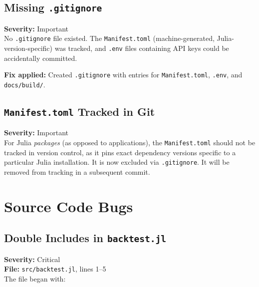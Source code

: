 \documentclass[11pt,a4paper]{article}
\begin{document}
\subsection{Missing \texttt{.gitignore}}
\label{sec:gitignore}

\textbf{Severity:} Important\\[0.3em]
No \texttt{.gitignore} file existed. The \texttt{Manifest.toml} (machine-generated,
Julia-version-specific) was tracked, and \texttt{.env} files containing API keys
could be accidentally committed.

\textbf{Fix applied:} Created \texttt{.gitignore} with entries for
\texttt{Manifest.toml}, \texttt{.env}, and \texttt{docs/build/}.

\subsection{\texttt{Manifest.toml} Tracked in Git}
\label{sec:manifest}

\textbf{Severity:} Important\\[0.3em]
For Julia \emph{packages} (as opposed to applications), the \texttt{Manifest.toml}
should not be tracked in version control, as it pins exact dependency versions
specific to a particular Julia installation. It is now excluded via
\texttt{.gitignore}. It will be removed from tracking in a subsequent commit.

\section{Source Code Bugs}

\subsection{Double Includes in \texttt{backtest.jl}}
\label{sec:double-include}

\textbf{Severity:} Critical\\
\textbf{File:} \texttt{src/backtest.jl}, lines 1--5\\[0.3em]
The file began with:
\end{document}
